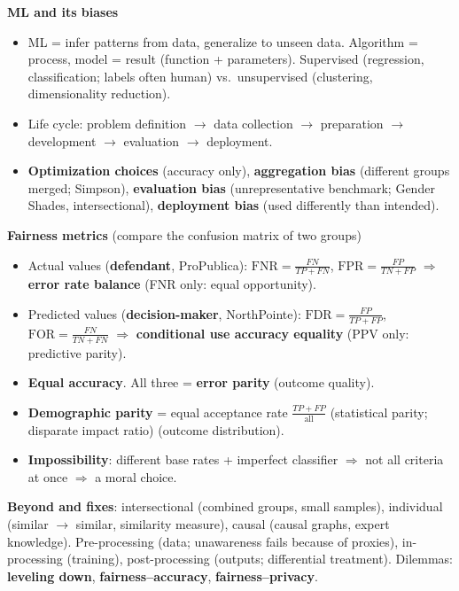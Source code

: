 \documentclass[11pt,a4paper,openany]{book}
\begin{document}
\begin{recapbox}[title={Exam-ready recap --- Fairness 2}]
\textbf{ML and its biases}
\begin{itemize}
  \item ML = infer patterns from data, generalize to unseen data. Algorithm = process, model =
        result (function + parameters). Supervised (regression, classification; labels often
        human) vs.\ unsupervised (clustering, dimensionality reduction).
  \item Life cycle: problem definition $\to$ data collection $\to$ preparation $\to$
        development $\to$ evaluation $\to$ deployment.
  \item \textbf{Optimization choices} (accuracy only), \textbf{aggregation bias} (different
        groups merged; Simpson), \textbf{evaluation bias} (unrepresentative benchmark; Gender
        Shades, intersectional), \textbf{deployment bias} (used differently than intended).
\end{itemize}
\textbf{Fairness metrics} (compare the confusion matrix of two groups)
\begin{itemize}
  \item Actual values (\textbf{defendant}, ProPublica): $\text{FNR}=\frac{FN}{TP+FN}$,
        $\text{FPR}=\frac{FP}{TN+FP}$ $\Rightarrow$ \textbf{error rate balance} (FNR only:
        equal opportunity).
  \item Predicted values (\textbf{decision-maker}, NorthPointe): $\text{FDR}=\frac{FP}{TP+FP}$,
        $\text{FOR}=\frac{FN}{TN+FN}$ $\Rightarrow$ \textbf{conditional use accuracy equality}
        (PPV only: predictive parity).
  \item \textbf{Equal accuracy}. All three = \textbf{error parity} (outcome quality).
  \item \textbf{Demographic parity} = equal acceptance rate $\frac{TP+FP}{\text{all}}$
        (statistical parity; disparate impact ratio) (outcome distribution).
  \item \textbf{Impossibility}: different base rates + imperfect classifier $\Rightarrow$ not all
        criteria at once $\Rightarrow$ a moral choice.
\end{itemize}
\textbf{Beyond and fixes}: intersectional (combined groups, small samples), individual
(similar $\to$ similar, similarity measure), causal (causal graphs, expert knowledge).
Pre-processing (data; unawareness fails because of proxies), in-processing (training),
post-processing (outputs; differential treatment). Dilemmas: \textbf{leveling down},
\textbf{fairness--accuracy}, \textbf{fairness--privacy}.


\end{recapbox}
\end{document}
